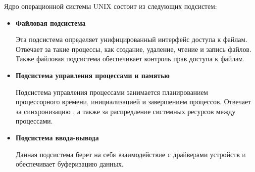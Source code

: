 Ядро операционной системы UNIX состоит из следующих подсистем:

\begin{itemize}
	\item \textbf{Файловая подсистема}

		Эта подсистема определяет унифицированный интерфейс доступа к файлам. Отвечает за такие процессы, как создание, удаление, чтение и запись файлов. Также файловая подсистема обеспечивает контроль прав доступа к файлам.

	\item \textbf{Подсистема управления процессами и памятью}

		Подсистема управления процессами занимается планированием процессорного времени, инициализацией и завершением процессов. Отвечает за синхронизацию , а также за распредление системных ресурсов между процессами.

	\newpage
	\item \textbf{Подсистема ввода-вывода}

		Данная подсистема берет на себя взаимодействие с драйверами устройств и обеспечивает буферизацию данных.
\end{itemize}
